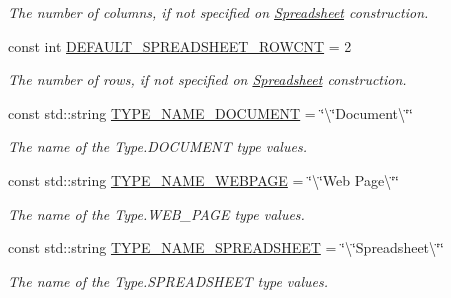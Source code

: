 \begin{DoxyCompactItemize}
\begin{DoxyCompactList}\small\item\em The number of columns, if not specified on \hyperlink{classdocs_1_1Spreadsheet}{Spreadsheet} construction. \end{DoxyCompactList}\item 
\hypertarget{namespacedocs_a7562daac15433871b1cc71ad74555032}{const int \hyperlink{namespacedocs_a7562daac15433871b1cc71ad74555032}{D\-E\-F\-A\-U\-L\-T\-\_\-\-S\-P\-R\-E\-A\-D\-S\-H\-E\-E\-T\-\_\-\-R\-O\-W\-C\-N\-T} = 2}\label{namespacedocs_a7562daac15433871b1cc71ad74555032}

\begin{DoxyCompactList}\small\item\em The number of rows, if not specified on \hyperlink{classdocs_1_1Spreadsheet}{Spreadsheet} construction. \end{DoxyCompactList}\item 
\hypertarget{namespacedocs_a88f8e41b03147cf4197261676999d12c}{const std\-::string \hyperlink{namespacedocs_a88f8e41b03147cf4197261676999d12c}{T\-Y\-P\-E\-\_\-\-N\-A\-M\-E\-\_\-\-D\-O\-C\-U\-M\-E\-N\-T} = \char`\"{}\textbackslash{}\char`\"{}Document\textbackslash{}\char`\"{}\char`\"{}}\label{namespacedocs_a88f8e41b03147cf4197261676999d12c}

\begin{DoxyCompactList}\small\item\em The name of the Type.\-D\-O\-C\-U\-M\-E\-N\-T type values. \end{DoxyCompactList}\item 
\hypertarget{namespacedocs_ac41cf3635e22c3750deddd000fd4c34b}{const std\-::string \hyperlink{namespacedocs_ac41cf3635e22c3750deddd000fd4c34b}{T\-Y\-P\-E\-\_\-\-N\-A\-M\-E\-\_\-\-W\-E\-B\-P\-A\-G\-E} = \char`\"{}\textbackslash{}\char`\"{}Web Page\textbackslash{}\char`\"{}\char`\"{}}\label{namespacedocs_ac41cf3635e22c3750deddd000fd4c34b}

\begin{DoxyCompactList}\small\item\em The name of the Type.\-W\-E\-B\-\_\-\-P\-A\-G\-E type values. \end{DoxyCompactList}\item 
\hypertarget{namespacedocs_a3f58481f03c01b3da04828585d14ff77}{const std\-::string \hyperlink{namespacedocs_a3f58481f03c01b3da04828585d14ff77}{T\-Y\-P\-E\-\_\-\-N\-A\-M\-E\-\_\-\-S\-P\-R\-E\-A\-D\-S\-H\-E\-E\-T} = \char`\"{}\textbackslash{}\char`\"{}Spreadsheet\textbackslash{}\char`\"{}\char`\"{}}\label{namespacedocs_a3f58481f03c01b3da04828585d14ff77}

\begin{DoxyCompactList}\small\item\em The name of the Type.\-S\-P\-R\-E\-A\-D\-S\-H\-E\-E\-T type values. \end{DoxyCompactList}\end{DoxyCompactItemize}


